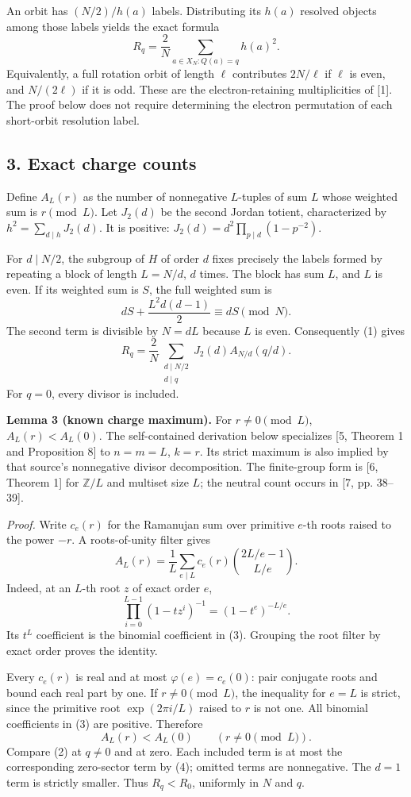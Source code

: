 \documentclass[
  11pt,
]{article}
\begin{document}
An orbit has \((N/2)/h(a)\) labels. Distributing its \(h(a)\) resolved
objects among those labels yields the exact formula \[
R_q=\frac2N\sum_{a\in X_N:Q(a)=q}h(a)^2.\tag{1}
\] Equivalently, a full rotation orbit of length \(\ell\) contributes
\(2N/\ell\) if \(\ell\) is even, and \(N/(2\ell)\) if it is odd. These
are the electron-retaining multiplicities of {[}1{]}. The proof below
does not require determining the electron permutation of each
short-orbit resolution label.

\subsection{3. Exact charge counts}\label{exact-charge-counts}

Define \(A_L(r)\) as the number of nonnegative \(L\)-tuples of sum \(L\)
whose weighted sum is \(r\pmod L\). Let \(J_2(d)\) be the second Jordan
totient, characterized by \(h^2=\sum_{d\mid h}J_2(d)\). It is positive:
\(J_2(d)=d^2\prod_{p\mid d}(1-p^{-2})\).

For \(d\mid N/2\), the subgroup of \(H\) of order \(d\) fixes precisely
the labels formed by repeating a block of length \(L=N/d\), \(d\) times.
The block has sum \(L\), and \(L\) is even. If its weighted sum is
\(S\), the full weighted sum is \[
dS+\frac{L^2d(d-1)}2\equiv dS\pmod N.
\] The second term is divisible by \(N=dL\) because \(L\) is even.
Consequently (1) gives \[
R_q=\frac2N\sum_{\substack{d\mid N/2\\d\mid q}}
J_2(d)A_{N/d}(q/d).\tag{2}
\] For \(q=0\), every divisor is included.

\textbf{Lemma 3 (known charge maximum).} For \(r\ne0\pmod L\),
\(A_L(r)<A_L(0)\). The self-contained derivation below specializes
{[}5, Theorem 1 and Proposition 8{]} to \(n=m=L\), \(k=r\).
Its strict maximum is also implied by that source's nonnegative divisor
decomposition. The finite-group form is {[}6, Theorem 1{]} for
\(\mathbb Z/L\) and multiset size \(L\); the neutral count occurs in
{[}7, pp. 38--39{]}.

\textit{Proof.} Write \(c_e(r)\) for the Ramanujan sum over primitive \(e\)-th roots
raised to the power \(-r\). A roots-of-unity filter gives \[
A_L(r)=\frac1L\sum_{e\mid L}c_e(r)
\binom{2L/e-1}{L/e}.\tag{3}
\] Indeed, at an \(L\)-th root \(z\) of exact order \(e\), \[
\prod_{i=0}^{L-1}(1-tz^i)^{-1}=(1-t^e)^{-L/e}.
\] Its \(t^L\) coefficient is the binomial coefficient in (3). Grouping
the root filter by exact order proves the identity.

Every \(c_e(r)\) is real and at most \(\varphi(e)=c_e(0)\): pair
conjugate roots and bound each real part by one. If \(r\ne0\pmod L\),
the inequality for \(e=L\) is strict, since the primitive root
\(\exp(2\pi i/L)\) raised to \(r\) is not one. All binomial coefficients
in (3) are positive. Therefore \[
A_L(r)<A_L(0)\qquad(r\ne0\pmod L).\tag{4}
\] Compare (2) at \(q\ne0\) and at zero. Each included term is at most
the corresponding zero-sector term by (4); omitted terms are
nonnegative. The \(d=1\) term is strictly smaller. Thus \(R_q<R_0\),
uniformly in \(N\) and \(q\).
\end{document}
